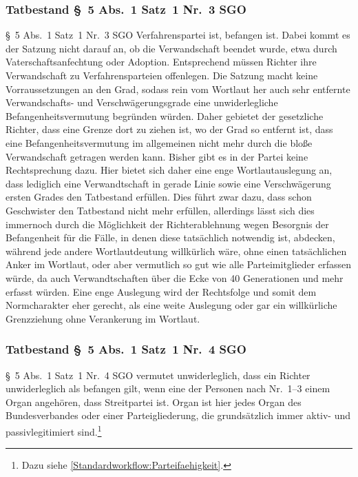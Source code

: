 \subsubsection{Tatbestand \S~5 Abs.~1 Satz~1 Nr.~3 SGO}
\label{Zusammensetzung:Spruchkoerper:Befangenheitsvermutung:Nr3}
\S~5 Abs.~1 Satz~1 Nr.~3 SGO Verfahrenspartei ist, befangen ist.
Dabei kommt es der Satzung nicht darauf an, ob die Verwandschaft beendet wurde, etwa durch Vaterschaftsanfechtung oder Adoption.
Entsprechend müssen Richter ihre Verwandschaft zu Verfahrensparteien offenlegen.
Die Satzung macht keine Vorraussetzungen an den Grad, sodass rein vom Wortlaut her auch sehr entfernte Verwandschafts- und Verschwägerungsgrade eine unwiderlegliche Befangenheitsvermutung begründen würden.
Daher gebietet der gesetzliche Richter, dass eine Grenze dort zu ziehen ist, wo der Grad so entfernt ist, dass eine Befangenheitsvermutung im allgemeinen nicht mehr durch die bloße Verwandschaft getragen werden kann.
Bisher gibt es in der Partei keine Rechtsprechung dazu.
Hier bietet sich daher eine enge Wortlautauslegung an, dass lediglich eine Verwandtschaft in gerade Linie sowie eine Verschwägerung ersten Grades den Tatbestand erfüllen.
Dies führt zwar dazu, dass schon Geschwister den Tatbestand nicht mehr erfüllen, allerdings lässt sich dies immernoch durch die Möglichkeit der Richterablehnung wegen Besorgnis der Befangenheit für die Fälle, in denen diese tatsächlich notwendig ist, abdecken, während jede andere Wortlautdeutung willkürlich wäre, ohne einen tatsächlichen Anker im Wortlaut, oder aber vermutlich so gut wie alle Parteimitglieder erfassen würde, da auch Verwandtschaften über die Ecke von 40 Generationen und mehr erfasst würden.
Eine enge Auslegung wird der Rechtsfolge und somit dem Normcharakter eher gerecht, als eine weite Auslegung oder gar ein willkürliche Grenzziehung ohne Verankerung im Wortlaut.

\subsubsection{Tatbestand \S~5 Abs.~1 Satz~1 Nr.~4 SGO}
\label{Zusammensetzung:Spruchkoerper:Befangenheitsvermutung:Nr4}
\S~5 Abs.~1 Satz~1 Nr.~4 SGO vermutet unwiderleglich, dass ein Richter unwiderleglich als befangen gilt, wenn eine der Personen nach Nr.~1--3 einem Organ angehören, dass Streitpartei ist.
Organ ist hier jedes Organ des Bundesverbandes oder einer Parteigliederung, die grundsätzlich immer aktiv- und passivlegitimiert sind.\footnote{Dazu siehe \ref{Standardworkflow:Parteifaehigkeit}.}

